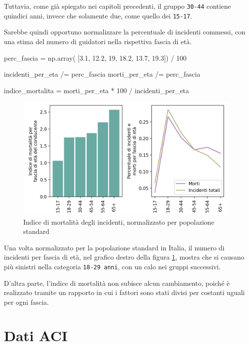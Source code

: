 \documentclass[a4paper,12pt]{report}
\newcommand{\columnstyle}[1]{\texttt{#1}}
\begin{document}
Tuttavia, come già spiegato nei capitoli precedenti, il gruppo \columnstyle{30-44} 
contiene quindici anni, invece che solamente due, come quello dei \columnstyle{15-17}. 

Sarebbe quindi opportuno normalizzare la percentuale di incidenti commessi, 
con una stima del numero di guidatori nella rispettiva fascia di età. 

\begin{code}
perc_fascia = np.array( [3.1, 12.2, 19, 18.2, 13.7, 19.3]) / 100

incidenti_per_eta /= perc_fascia
morti_per_eta /= perc_fascia

indice_mortalita = morti_per_eta * 100 / incidenti_per_eta
\end{code}

\begin{figure}
    \includegraphics[width=\linewidth]{../src/incidenti/incidenti_senza_coords/mortalita/indice_mort_norm.png}
    \caption{Indice di mortalità degli incidenti, normalizzato per popolazione standard}
    \label{fig:indice-mort-norm}
\end{figure}

Una volta normalizzato per la popolazione standard in Italia, il numero di incidenti per 
fascia di età, nel grafico destro della figura \ref{fig:indice-mort-norm}, mostra che  
si causano più sinistri nella categoria \columnstyle{18-29 anni}, 
con un calo nei gruppi successivi. 

D'altra parte, l'indice di mortalità non subisce alcun cambiamento, 
poiché è realizzato tramite 
un rapporto in cui i fattori sono stati divisi per costanti uguali per ogni fascia. 

\section{Dati ACI}
\end{document}
